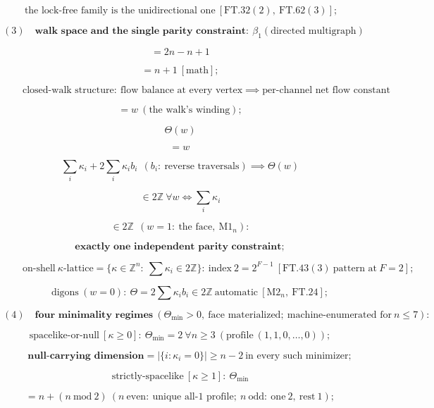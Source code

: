 \begin{theorem}
\[
\ \text{the lock-free family is the unidirectional one}\ [\mathrm{FT.32}(2),\ \mathrm{FT.62}(3)];
\]

\[
(3)\quad\textbf{walk space and the single parity constraint}:\ \beta_1(\text{directed multigraph})
\]

\[
= 2n-n+1
\]

\[
= n+1\ [\text{math}];
\]

\[
\qquad \text{closed-walk structure}:\ \text{flow balance at every vertex}\implies\text{per-channel net flow constant}
\]

\[
= w\ (\text{the walk's winding});
\]

\[
\Theta(w)
\]

\[
= w\,
\]

\[
\textstyle\sum_i\kappa_i+2\sum_i\kappa_i b_i\ \ (b_i:\ \text{reverse traversals})\implies\Theta(w)
\]

\[
\in 2\mathbb Z\ \forall w\iff\textstyle\sum_i\kappa_i
\]

\[
\in 2\mathbb Z\ \ (w{=}1:\ \text{the face},\ \mathrm{M1}_n):
\]

\[
\textbf{exactly one independent parity constraint};
\]

\[
\qquad \text{on-shell}\ \kappa\text{-lattice}=\{\kappa\in\mathbb Z^n:\ \textstyle\sum\kappa_i\in2\mathbb Z\}:\ \text{index}\ 2=2^{F-1}\ [\mathrm{FT.43}(3)\ \text{pattern at}\ F{=}2];
\]

\[
\qquad \text{digons}\ (w{=}0):\ \Theta=2\sum\kappa_ib_i\in2\mathbb Z\ \text{automatic}\ [\mathrm{M2}_n,\ \mathrm{FT.24}];
\]

\[
(4)\quad\textbf{four minimality regimes}\ (\Theta_{\min}>0,\ \text{face materialized};\ \text{machine-enumerated for}\ n\le7):
\]

\[
\text{spacelike-or-null}\ [\kappa\ge0]:\ \Theta_{\min}=2\ \forall n\ge3\ (\text{profile}\ (1,1,0,\dots,0));
\]

\[
\qquad \textbf{null-carrying dimension}=|\{i:\kappa_i=0\}|\ge n-2\ \text{in every such minimizer};
\]

\[
\text{strictly-spacelike}\ [\kappa\ge1]:\ \Theta_{\min}
\]

\[
= n+(n\ \mathrm{mod}\ 2)\ (n\ \text{even}:\ \text{unique all-1 profile};\ n\ \text{odd}:\ \text{one}\ 2,\ \text{rest}\ 1);
\]


\end{theorem}
